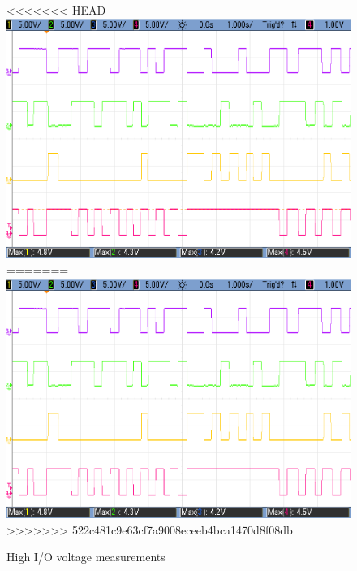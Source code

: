 \begin{figure}[H]
    \begin{center}
<<<<<<< HEAD
        \includegraphics[scale=0.3]{../Exercise1/Moore/report/images/e3e1_1s4i_2b1_2b2_v1.png}
=======
        \includegraphics[width=0.75\linewidth]{./images/e3e1_1s4i_2b1_2b2_v1.png}
>>>>>>> 522c481c9e63cf7a9008eceeb4bca1470d8f08db
        \caption{High I/O voltage measurements}
        \label{fig:moore_max}
    \end{center}
\end{figure}

